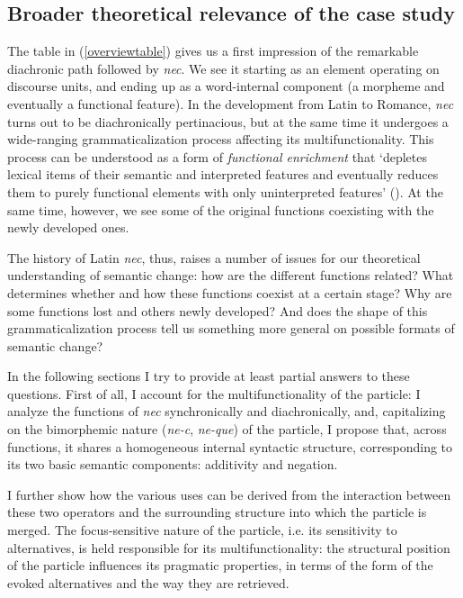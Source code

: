 \documentclass[output=paper,modfonts,nonflat,citecolor=brown,
showindex
]{langsci/langscibook}
\begin{document}
\subsection{Broader theoretical relevance of the case study} \label{theoreticalrelevance}

The table in (\ref{overviewtable}) gives us a first impression of the remarkable diachronic path followed by {\em{nec}}. We see it starting as an element operating on discourse units, and ending up as a word-internal component (a morpheme and eventually a functional feature). In the development from Latin to Romance, {\em{nec}} turns out to be diachronically pertinacious, but at the same time it undergoes a wide-ranging grammaticalization process affecting its multifunctionality. This process can be understood as a form of {\em{functional enrichment}} that `depletes lexical items of their semantic and interpreted features and eventually reduces them to purely functional elements with only uninterpreted features' (\citealt[73]{Kiparsky15}). At the same time, however, we see some of the original functions coexisting with the newly developed ones.  

The history of Latin {\em{nec}}, thus, raises a number of issues for our theoretical understanding of semantic change: how are the different functions related? What determines whether and how these functions coexist at a certain stage? Why are some functions lost and others newly developed? And does the shape of this grammaticalization process tell us something more general on possible formats of semantic change?

In the following sections I try to provide at least partial answers to these questions. First of all, I account for the multifunctionality of the particle: I analyze the functions of {\em{nec}} synchronically and diachronically, and, capitalizing on the bimorphemic nature ({\em{ne-c}}, {\em{ne-que}}) of the particle, I propose that, across functions, it shares a homogeneous internal syntactic structure, corresponding to its two basic semantic components: additivity and negation. 

I further show how the various uses can be derived from the interaction between these two operators and the surrounding structure into which the particle is merged. The focus-sensitive nature of the particle, i.e. its sensitivity to alternatives, is held responsible for its multifunctionality: the structural position of the particle influences its pragmatic properties, in terms of the form of the evoked alternatives and the way they are retrieved. 
\end{document}
